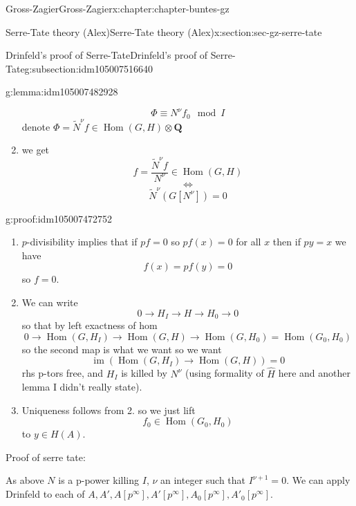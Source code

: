 \documentclass[oneside,10pt,]{book}
\numberwithin{equation}{section}
\newcommand{\lb}{[}
\newcommand{\rb}{]}
\newcommand{\QQ}{\mathbf{Q}}
\DeclareMathOperator{\Hom}{Hom}
\DeclareMathOperator{\im}{im}
\begin{document}
\begin{chapterptx}{Gross-Zagier}{}{Gross-Zagier}{}{}{x:chapter:chapter-buntes-gz}
\begin{sectionptx}{Serre-Tate theory (Alex)}{}{Serre-Tate theory (Alex)}{}{}{x:section:sec-gz-serre-tate}
\begin{subsectionptx}{Drinfeld's proof of Serre-Tate}{}{Drinfeld's proof of Serre-Tate}{}{}{g:subsection:idm105007516640}
\begin{lemma}{}{}{g:lemma:idm105007482928}
\begin{enumerate}
\begin{equation*}
\Phi \equiv  N^\nu f_0 \mod I
\end{equation*}
denote \(\Phi = \tilde N^\nu f \in \Hom(G,H) \otimes \QQ\)%
\item{}we get%
\begin{equation*}
f = \frac{\tilde N^\nu f}{N^\nu } \in \Hom (G,H)
\end{equation*}
%
\begin{equation*}
\iff
\end{equation*}
%
\begin{equation*}
\tilde N^\nu  (G[N^\nu  ] ) = 0
\end{equation*}
%
\end{enumerate}
%
\end{lemma}
\begin{proofptx}{}{g:proof:idm105007472752}
%
\begin{enumerate}
\item{}\(p\)-divisibility implies that if \(pf = 0\) so \(pf(x)=  0\) for all \(x\) then if \(py = x\) we have%
\begin{equation*}
f(x) = pf(y) =0
\end{equation*}
so \(f = 0\).%
\item{}We can write%
\begin{equation*}
0 \to H_I \to H \to H_0 \to 0
\end{equation*}
so that by left exactness of hom%
\begin{equation*}
0 \to \Hom(G, H_I) \to  \Hom(G, H) \to  \Hom(G, H_0) = \Hom(G_0, H_0)
\end{equation*}
so the second map is what we want so we want%
\begin{equation*}
\im(\Hom(G, H_I) \to \Hom(G,H)) = 0
\end{equation*}
rhs p-tors free, and \(H_I\) is killed by \(N^\nu \) (using formality of \(\hat H \) here and another lemma I didn't really state).%
\item{}Uniqueness follows from 2. so we just lift%
\begin{equation*}
f_0 \in \Hom(G_0, H_0)
\end{equation*}
to \(y \in H(A)\).%
\end{enumerate}
%
\end{proofptx}
\end{subsectionptx}
Proof of serre tate:%
\par
As above \(N\) is a p-power killing \(I\), \(\nu \) an integer  such that \(I^{\nu + 1} = 0\). We can apply Drinfeld to each of \(A, A', A\lb p^\infty \rb, A'\lb p^\infty \rb , A_0\lb p^\infty \rb , A'_0 \lb p^\infty \rb \).%

\end{sectionptx}
\end{chapterptx}
\end{document}
